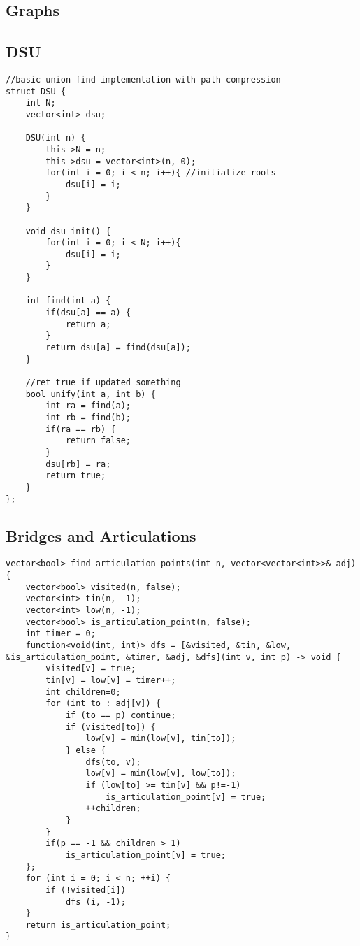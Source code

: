 \documentclass[8pt, headheight=10pt]{scrartcl}
\begin{document}
\begin{multicols*}{3}
\section{Graphs}
\subsection{DSU}
\begin{lstlisting}
//basic union find implementation with path compression
struct DSU {
    int N;
    vector<int> dsu;

    DSU(int n) {
        this->N = n;
        this->dsu = vector<int>(n, 0);
        for(int i = 0; i < n; i++){ //initialize roots
            dsu[i] = i;
        }
    }

    void dsu_init() {
        for(int i = 0; i < N; i++){
            dsu[i] = i;
        }
    }

    int find(int a) {
        if(dsu[a] == a) {
            return a;
        }
        return dsu[a] = find(dsu[a]);
    }

    //ret true if updated something
    bool unify(int a, int b) {
        int ra = find(a);
        int rb = find(b);
        if(ra == rb) {
            return false;
        }
        dsu[rb] = ra;
        return true;
    }
};
\end{lstlisting}

\subsection{Bridges and Articulations}
\begin{lstlisting}
vector<bool> find_articulation_points(int n, vector<vector<int>>& adj) {
    vector<bool> visited(n, false);
    vector<int> tin(n, -1);
    vector<int> low(n, -1);
    vector<bool> is_articulation_point(n, false);
    int timer = 0;
    function<void(int, int)> dfs = [&visited, &tin, &low, &is_articulation_point, &timer, &adj, &dfs](int v, int p) -> void {
        visited[v] = true;
        tin[v] = low[v] = timer++;
        int children=0;
        for (int to : adj[v]) {
            if (to == p) continue;
            if (visited[to]) {
                low[v] = min(low[v], tin[to]);
            } else {
                dfs(to, v);
                low[v] = min(low[v], low[to]);
                if (low[to] >= tin[v] && p!=-1)
                    is_articulation_point[v] = true;
                ++children;
            }
        }
        if(p == -1 && children > 1)
            is_articulation_point[v] = true;
    };
    for (int i = 0; i < n; ++i) {
        if (!visited[i])
            dfs (i, -1);
    }
    return is_articulation_point;
}
\end{lstlisting}


\end{multicols*}
\end{document}
